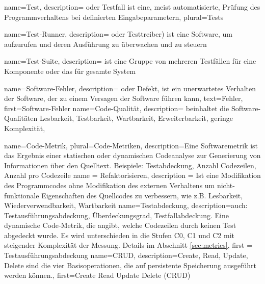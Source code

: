  {
  name={Test},
  description= {oder Testfall ist eine, meist automatisierte, Prüfung des Programmverhaltens bei definierten Eingabeparametern},
  plural=Tests
}

 {
  name={Test-Runner},
  description= {oder Testtreiber) ist eine Software, um  aufzurufen und deren Ausführung zu überwachen und zu steuern}
}

 {
  name={Test-Suite},
  description= {ist eine Gruppe von mehreren Testfällen für eine Komponente oder das für gesamte System}
}

 {
  name={Software-Fehler},
  description= {oder Defekt, ist ein unerwartetes Verhalten der Software, der zu einem Versagen der Software führen kann},
text=Fehler,
first={Software-Fehler}
}
 {
  name={Code-Qualität},
  description= {beinhaltet die Software-Qualitäten Lesbarkeit, Testbarkeit, Wartbarkeit, Erweiterbarkeit, geringe Komplexität},
}

 {
  name={Code-Metrik},
  plural={Code-Metriken},
  description={Eine Softwaremetrik ist das Ergebnis einer statischen oder dynamischen Codeanalyse zur Generierung von Informationen über den Quelltext. Beispiele: Testabdeckung, Anzahl Codezeilen, Anzahl  pro Codezeile}
}
 {
  name = {Refaktorisieren},
  description = {Ist eine Modifikation des Programmcodes ohne Modifikation des externen Verhaltens um nicht-funktionale Eigenschaften des Quellcodes zu verbessern, wie z.B. Lesbarkeit, Wiederverwendbarkeit, Wartbarkeit}
}
 {
  name=Testabdeckung,
  description={auch: Testausführungsabdeckung, Überdeckungsgrad, Testfallabdeckung. Eine dynamische Code-Metrik, die angibt, welche Codezeilen durch keinen Test abgedeckt wurde. Es wird unterschieden in die Stufen C0, C1 und C2 mit steigender Komplexität der Messung. Details im Abschnitt \ref{sec:metrics}},
  first = {Testausführungsabdeckung}
}
 {
  name={CRUD},
  description={Create, Read, Update, Delete sind die vier Basisoperationen, die auf persistente Speicherung ausgeführt werden können.},
  first={Create Read Update Delete (CRUD)}
}

